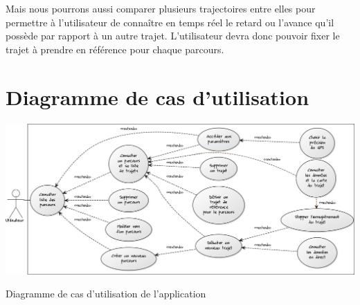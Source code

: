 Mais nous pourrons aussi comparer plusieurs trajectoires entre elles pour permettre à l'utilisateur de connaître en temps réel le retard ou l'avance qu'il possède par rapport à un autre trajet. L'utilisateur devra donc pouvoir fixer le trajet à prendre en référence pour chaque parcours.

\section{Diagramme de cas d'utilisation}
\begin{img}
  \includegraphics[scale=0.35]{img/DUC.png}
  \caption{Diagramme de cas d'utilisation de l'application}
\end{img}
